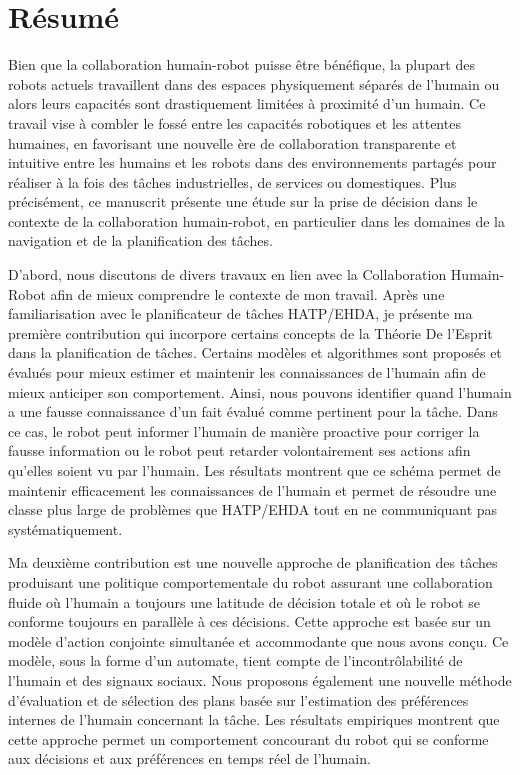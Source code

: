 \chapter*{Résumé}

Bien que la collaboration humain-robot puisse être bénéfique, la plupart des robots actuels travaillent dans des espaces physiquement séparés de l'humain ou alors leurs capacités sont drastiquement limitées à proximité d'un humain. Ce travail vise à combler le fossé entre les capacités robotiques et les attentes humaines, en favorisant une nouvelle ère de collaboration transparente et intuitive entre les humains et les robots dans des environnements partagés pour réaliser à la fois des tâches industrielles, de services ou domestiques. Plus précisément, ce manuscrit présente une étude sur la prise de décision dans le contexte de la collaboration humain-robot, en particulier dans les domaines de la navigation et de la planification des tâches.

D'abord, nous discutons de divers travaux en lien avec la Collaboration Humain-Robot afin de mieux comprendre le contexte de mon travail. Après une familiarisation avec le planificateur de tâches HATP/EHDA, je présente ma première contribution qui incorpore certains concepts de la Théorie De l'Esprit dans la planification de tâches. Certains modèles et algorithmes sont proposés et évalués pour mieux estimer et maintenir les connaissances de l'humain afin de mieux anticiper son comportement. Ainsi, nous pouvons identifier quand l'humain a une fausse connaissance d'un fait évalué comme pertinent pour la tâche. Dans ce cas, le robot peut informer l'humain de manière proactive pour corriger la fausse information ou le robot peut retarder volontairement ses actions afin qu'elles soient vu par l'humain. Les résultats montrent que ce schéma permet de maintenir efficacement les connaissances de l'humain et permet de résoudre une classe plus large de problèmes que HATP/EHDA tout en ne communiquant pas systématiquement.

Ma deuxième contribution est une nouvelle approche de planification des tâches produisant une politique comportementale du robot assurant une collaboration fluide où l'humain a toujours une latitude de décision totale et où le robot se conforme toujours en parallèle à ces décisions. Cette approche est basée sur un modèle d'action conjointe simultanée et accommodante que nous avons conçu. Ce modèle, sous la forme d'un automate, tient compte de l'incontrôlabilité de l'humain et des signaux sociaux. Nous proposons également une nouvelle méthode d'évaluation et de sélection des plans basée sur l'estimation des préférences internes de l'humain concernant la tâche. Les résultats empiriques montrent que cette approche permet un comportement concourant du robot qui se conforme aux décisions et aux préférences en temps réel de l'humain.

